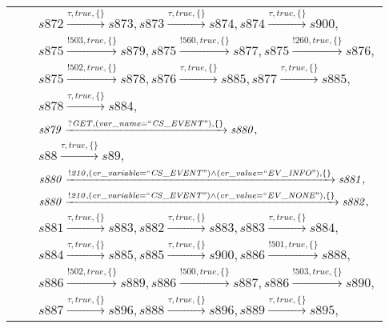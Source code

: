 \begin{tabular}{lcp{350px}}
& & $\mathit{s872}\xrightarrow{\mathit{\tau}, \mathit{true}, \{\}}\mathit{s873},\mathit{s873}\xrightarrow{\mathit{\tau}, \mathit{true}, \{\}}\mathit{s874},\mathit{s874}\xrightarrow{\mathit{\tau}, \mathit{true}, \{\}}\mathit{s900},$ \\
& & $\mathit{s875}\xrightarrow{\mathit{!503}, \mathit{true}, \{\}}\mathit{s879},\mathit{s875}\xrightarrow{\mathit{!560}, \mathit{true}, \{\}}\mathit{s877},\mathit{s875}\xrightarrow{\mathit{!260}, \mathit{true}, \{\}}\mathit{s876},$ \\
& & $\mathit{s875}\xrightarrow{\mathit{!502}, \mathit{true}, \{\}}\mathit{s878},\mathit{s876}\xrightarrow{\mathit{\tau}, \mathit{true}, \{\}}\mathit{s885},\mathit{s877}\xrightarrow{\mathit{\tau}, \mathit{true}, \{\}}\mathit{s885},$ \\
& & $\mathit{s878}\xrightarrow{\mathit{\tau}, \mathit{true}, \{\}}\mathit{s884},$ \\
& & $\mathit{s879}\xrightarrow{\mathit{?GET}, \mathit{(var\_name = ``CS\_EVENT")}, \{\}}\mathit{s880},$ \\
& & $\mathit{s88}\xrightarrow{\mathit{\tau}, \mathit{true}, \{\}}\mathit{s89},$ \\
& & $\mathit{s880}\xrightarrow{\mathit{!210}, \mathit{(cr\_variable = ``CS\_EVENT") \land (cr\_value = ``EV\_INFO")}, \{\}}\mathit{s881},$ \\
& & $\mathit{s880}\xrightarrow{\mathit{!210}, \mathit{(cr\_variable = ``CS\_EVENT") \land (cr\_value = ``EV\_NONE")}, \{\}}\mathit{s882},$ \\
& & $\mathit{s881}\xrightarrow{\mathit{\tau}, \mathit{true}, \{\}}\mathit{s883},\mathit{s882}\xrightarrow{\mathit{\tau}, \mathit{true}, \{\}}\mathit{s883},\mathit{s883}\xrightarrow{\mathit{\tau}, \mathit{true}, \{\}}\mathit{s884},$ \\
& & $\mathit{s884}\xrightarrow{\mathit{\tau}, \mathit{true}, \{\}}\mathit{s885},\mathit{s885}\xrightarrow{\mathit{\tau}, \mathit{true}, \{\}}\mathit{s900},\mathit{s886}\xrightarrow{\mathit{!501}, \mathit{true}, \{\}}\mathit{s888},$ \\
& & $\mathit{s886}\xrightarrow{\mathit{!502}, \mathit{true}, \{\}}\mathit{s889},\mathit{s886}\xrightarrow{\mathit{!500}, \mathit{true}, \{\}}\mathit{s887},\mathit{s886}\xrightarrow{\mathit{!503}, \mathit{true}, \{\}}\mathit{s890},$ \\
& & $\mathit{s887}\xrightarrow{\mathit{\tau}, \mathit{true}, \{\}}\mathit{s896},\mathit{s888}\xrightarrow{\mathit{\tau}, \mathit{true}, \{\}}\mathit{s896},\mathit{s889}\xrightarrow{\mathit{\tau}, \mathit{true}, \{\}}\mathit{s895},$ \\
\end{tabular}

